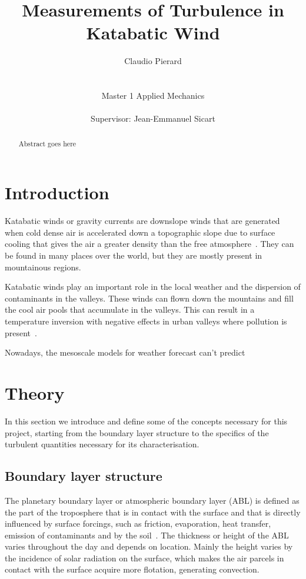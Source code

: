 \documentclass[a4paper,12pt]{article}
\title{Measurements of Turbulence in Katabatic Wind}
\author{Claudio Pierard \\
\\
\\
Master 1 Applied Mechanics\\
\\
Supervisor: Jean-Emmanuel Sicart}
\begin{document}
\renewcommand{\labelitemi}{$\bullet$}

\maketitle
\begin{abstract}
    Abstract goes here
\end{abstract}

\newpage

\tableofcontents

\newpage

\section{Introduction}

Katabatic winds or gravity currents are downslope winds that are generated when cold dense air is accelerated down a topographic slope due to surface cooling that gives the air a greater density than the free atmosphere~\citep{poulos2008observational}. They can be found in many places over the world, but they are mostly present in mountainous regions.

Katabatic winds play an important role in the local weather and the dispersion of contaminants in the valleys. These winds can flown down the mountains and fill the cool air pools that accumulate in the valleys. This can result in a temperature inversion with negative effects in urban valleys where pollution is present~\citep{largeron2016persistent}. 

Nowadays, the mesoscale models for weather forecast can't predict 
\section{Theory}

In this section we introduce and define some of the concepts necessary for this project, starting from the boundary layer structure to the specifics of the turbulent quantities necessary for its characterisation.

\subsection{Boundary layer structure}
The planetary boundary layer or atmospheric boundary layer (ABL) is defined as the part of the troposphere that is in contact with the surface and that is directly influenced by surface forcings, such as friction, evaporation, heat transfer, emission of contaminants and by the soil~\citep{stull2012introduction}. The thickness or height of the ABL varies throughout the day and depends on location. Mainly the height varies by the incidence of solar radiation on the surface, which makes the air parcels in contact with the surface acquire more flotation, generating convection.
\end{document}
